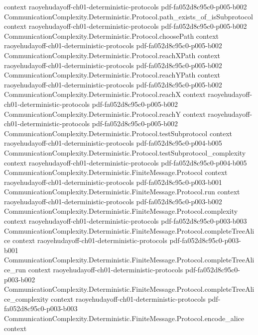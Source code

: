 \begin{lemma}
  {context}
  {raoyehudayoff-ch01-deterministic-protocols}
  {pdf-fa052d8c95c0-p005-b002}
\proofstep
  {CommunicationComplexity.Deterministic.Protocol.path_exists_of_isSubprotocol}
  {context}
  {raoyehudayoff-ch01-deterministic-protocols}
  {pdf-fa052d8c95c0-p005-b002}
\proofstep
  {CommunicationComplexity.Deterministic.Protocol.choosePath}
  {context}
  {raoyehudayoff-ch01-deterministic-protocols}
  {pdf-fa052d8c95c0-p005-b002}
\proofstep
  {CommunicationComplexity.Deterministic.Protocol.reachXPath}
  {context}
  {raoyehudayoff-ch01-deterministic-protocols}
  {pdf-fa052d8c95c0-p005-b002}
\proofstep
  {CommunicationComplexity.Deterministic.Protocol.reachYPath}
  {context}
  {raoyehudayoff-ch01-deterministic-protocols}
  {pdf-fa052d8c95c0-p005-b002}
\proofstep
  {CommunicationComplexity.Deterministic.Protocol.reachX}
  {context}
  {raoyehudayoff-ch01-deterministic-protocols}
  {pdf-fa052d8c95c0-p005-b002}
\proofstep
  {CommunicationComplexity.Deterministic.Protocol.reachY}
  {context}
  {raoyehudayoff-ch01-deterministic-protocols}
  {pdf-fa052d8c95c0-p005-b002}
\proofstep
  {CommunicationComplexity.Deterministic.Protocol.testSubprotocol}
  {context}
  {raoyehudayoff-ch01-deterministic-protocols}
  {pdf-fa052d8c95c0-p004-b005}
\proofstep
  {CommunicationComplexity.Deterministic.Protocol.testSubprotocol_complexity}
  {context}
  {raoyehudayoff-ch01-deterministic-protocols}
  {pdf-fa052d8c95c0-p004-b005}
\proofstep
  {CommunicationComplexity.Deterministic.FiniteMessage.Protocol}
  {context}
  {raoyehudayoff-ch01-deterministic-protocols}
  {pdf-fa052d8c95c0-p003-b001}
\proofstep
  {CommunicationComplexity.Deterministic.FiniteMessage.Protocol.run}
  {context}
  {raoyehudayoff-ch01-deterministic-protocols}
  {pdf-fa052d8c95c0-p003-b002}
\proofstep
  {CommunicationComplexity.Deterministic.FiniteMessage.Protocol.complexity}
  {context}
  {raoyehudayoff-ch01-deterministic-protocols}
  {pdf-fa052d8c95c0-p003-b003}
\proofstep
  {CommunicationComplexity.Deterministic.FiniteMessage.Protocol.completeTreeAlice}
  {context}
  {raoyehudayoff-ch01-deterministic-protocols}
  {pdf-fa052d8c95c0-p003-b001}
\proofstep
  {CommunicationComplexity.Deterministic.FiniteMessage.Protocol.completeTreeAlice_run}
  {context}
  {raoyehudayoff-ch01-deterministic-protocols}
  {pdf-fa052d8c95c0-p003-b002}
\proofstep
  {CommunicationComplexity.Deterministic.FiniteMessage.Protocol.completeTreeAlice_complexity}
  {context}
  {raoyehudayoff-ch01-deterministic-protocols}
  {pdf-fa052d8c95c0-p003-b003}
\proofstep
  {CommunicationComplexity.Deterministic.FiniteMessage.Protocol.encode_alice}
  {context}

\end{lemma}
